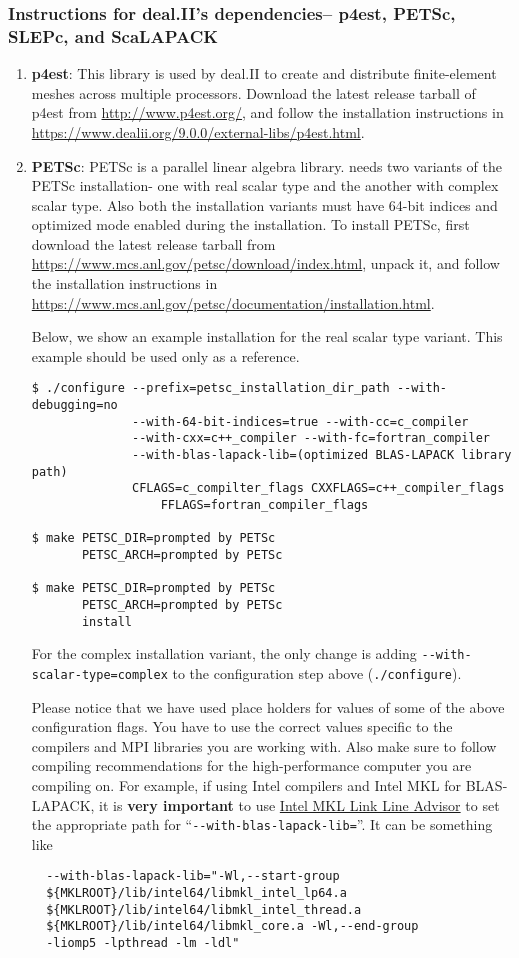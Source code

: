 \subsubsection{Instructions for deal.II's dependencies-- p4est, PETSc, SLEPc, and ScaLAPACK}
\begin{enumerate}
	\item   {\bf p4est}: This library is used by deal.II to create and distribute finite-element meshes across multiple processors. Download the latest release tarball of p4est from \url{http://www.p4est.org/}, and follow the installation instructions in \url{https://www.dealii.org/9.0.0/external-libs/p4est.html}. 

	\item {\bf PETSc}: PETSc is a parallel linear algebra library. \dftfe{} needs two variants of the PETSc installation- one with real scalar type and the another with complex scalar type. Also both the installation variants must have 64-bit indices and optimized mode enabled during the installation. To install PETSc, first download the latest release tarball from \url{https://www.mcs.anl.gov/petsc/download/index.html}, unpack it, and follow the installation instructions in \url{https://www.mcs.anl.gov/petsc/documentation/installation.html}. 
	
Below, we show an example installation for the real scalar type variant. 
This example should be used only as a reference.
\begin{verbatim}
$ ./configure --prefix=petsc_installation_dir_path --with-debugging=no 
              --with-64-bit-indices=true --with-cc=c_compiler
              --with-cxx=c++_compiler --with-fc=fortran_compiler
              --with-blas-lapack-lib=(optimized BLAS-LAPACK library path) 
              CFLAGS=c_compilter_flags CXXFLAGS=c++_compiler_flags
	              FFLAGS=fortran_compiler_flags

$ make PETSC_DIR=prompted by PETSc 
       PETSC_ARCH=prompted by PETSc

$ make PETSC_DIR=prompted by PETSc 
       PETSC_ARCH=prompted by PETSc
       install
\end{verbatim}
For the complex installation variant, the only change is adding  \verb|--with-scalar-type=complex| to the configuration step above (\verb|./configure|).

Please notice that we have used place holders for values of some of the above configuration flags. You have to use the correct values specific to the compilers and MPI libraries you are working with. Also make sure to follow compiling recommendations for the high-performance computer you are compiling on. For example, if using Intel compilers and Intel MKL for BLAS-LAPACK, it is {\bf very important} to use \href{https://software.intel.com/en-us/articles/intel-mkl-link-line-advisor}{Intel MKL Link Line Advisor} to set the appropriate path for ``\verb|--with-blas-lapack-lib=|''. It can be something like
\begin{verbatim}
  --with-blas-lapack-lib="-Wl,--start-group 
  ${MKLROOT}/lib/intel64/libmkl_intel_lp64.a 
  ${MKLROOT}/lib/intel64/libmkl_intel_thread.a 
  ${MKLROOT}/lib/intel64/libmkl_core.a -Wl,--end-group
  -liomp5 -lpthread -lm -ldl" 
\end{verbatim}


\end{enumerate}
